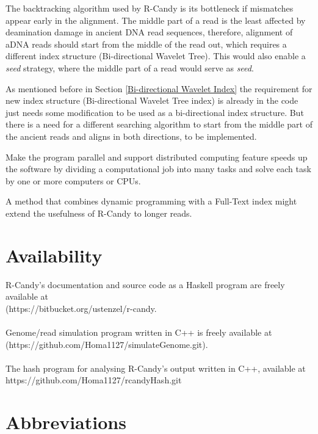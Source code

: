 \documentclass[11pt,a4paper]{report}
\begin{document}

The backtracking algorithm used by R-Candy is its bottleneck if mismatches 
appear early in the alignment. The middle part of a read is the least
affected by deamination damage in ancient DNA read sequences,
therefore, alignment of aDNA reads should start from the middle of the 
read out, which requires a different index structure (Bi-directional Wavelet 
Tree). This would also enable a \emph{seed} strategy, where the middle part 
of a read would serve as \emph{seed}.

As mentioned before in Section \ref{Bi-directional Wavelet Index} the 
requirement for new index structure (Bi-directional Wavelet Tree index) 
is already in the code just needs some modification to be used as a 
bi-directional index structure. 
But there is a need for a different searching algorithm to start from the 
middle part of the ancient reads and aligns in both directions, to be implemented.


Make the program parallel and support distributed computing feature
speeds up the software by dividing a computational job into many tasks 
and solve each task by one or more computers or CPUs.

A method that combines dynamic programming with a Full-Text index might 
extend the usefulness of R-Candy to longer reads.

\section{Availability} \label{Availability}

R-Candy's documentation and source code as a Haskell program are freely
available at\\
 (https://bitbucket.org/ustenzel/r-candy.
\\\\
Genome/read simulation program written in C++ is freely available at
(https://github.com/Homa1127/simulateGenome.git).
\\\\
The hash program for analysing R-Candy's output written in C++, available at
https://github.com/Homa1127/rcandyHash.git




\section{Abbreviations} \label{Abbreviations}
\end{document}
